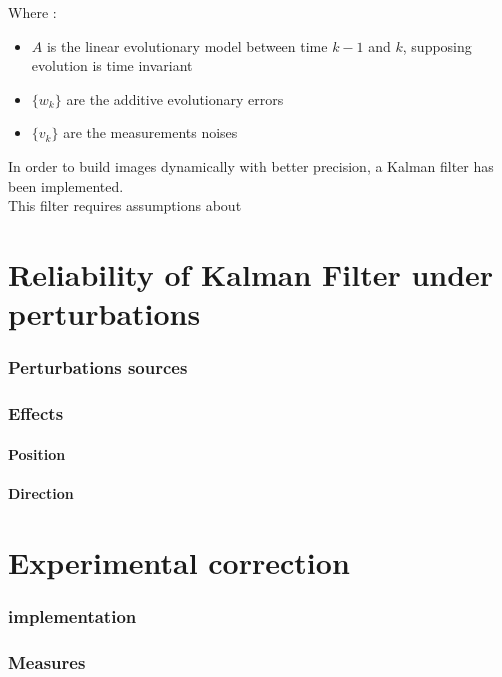 \documentclass[titlepage]{article}
\begin{document}
	Where :
	\begin{itemize}
		\item $A$ is the linear evolutionary model between time $k-1$ and $k$, supposing evolution is time invariant
		\item $\{w_k\}$ are the additive evolutionary errors
		\item $\{v_k\}$ are the measurements noises
	\end{itemize}
	
		
	In order to build images dynamically with better precision, a Kalman filter has been implemented.\\
	
	This filter requires assumptions about
	
	
	\newpage
	\part{Reliability of Kalman Filter under perturbations}
	\section{Perturbations sources}
	\section{Effects}
	\subsection{Position}
	\subsection{Direction}
	
	\newpage
	\part{Experimental correction}
	\section{implementation}
	\section{Measures}
	
\end{document}
